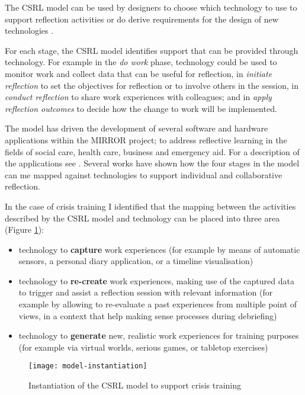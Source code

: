 The CSRL model can be used by designers to choose which technology to use to support reflection activities or do derive requirements for the design of new technologies \autocite{Krogstie:2013kf}.

For each stage, the CSRL model identifies support that can be provided through technology. For example in the \emph{do work} phase, technology could be used to monitor work and collect data that can be useful for reflection, in \emph{initiate reflection} to set the objectives for reflection or to involve others in the session, in \emph{conduct reflection} to share work experiences with colleagues; and in \emph{apply reflection outcomes} to decide how the change to work will be implemented.

The model has driven the development of several software and hardware applications within the MIRROR project; to address reflective learning in the fields of social care, health care, business and emergency aid. For a description of the applications see \autocite{Schwantzer:2014we}. Several works \autocites{Krogstie:2013kf}{Krogstie:2012ki} have shown how the four stages in the model can me mapped against technologies to support individual and collaborative reflection.

In the case of crisis training I identified that the mapping between the activities described by the CSRL model and technology can be placed into three area (Figure \ref{fig:model-instantiation}):
\begin{itemize}
	\itemsep1pt\parskip0pt 
	\item technology to \textbf{capture} work experiences (for example by means of automatic sensors, a personal diary application, or a timeline visualisation) 
	\item technology to \textbf{re-create} work experiences, making use of the captured data to trigger and assist a reflection session with relevant information (for example by allowing to re-evaluate a past experiences from multiple point of views, in a context that help making sense processes during debriefing) 
	\item technology to \textbf{generate} new, realistic work experiences for training purposes (for example via virtual worlds, serious games, or tabletop exercises) 
\end{itemize}
\begin{figure}
	[htb] \centering 
	\texttt{[image: model-instantiation]} \caption{Instantiation of the CSRL model to support crisis training} \label{fig:model-instantiation} 
\end{figure}

